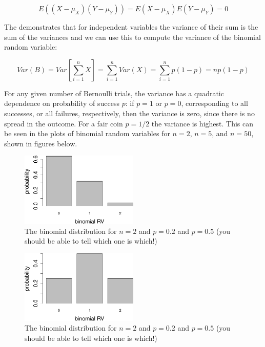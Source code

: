 \documentclass[
  letterpaper,
  DIV=11,
  numbers=noendperiod]{scrreprt}
\begin{document}
\[E((X-\mu_X)(Y-\mu_Y))  = E(X-\mu_X)E(Y-\mu_Y) = 0\]

The demonstrates that for independent variables the variance of their
sum is the sum of the variances and we can use this to compute the
variance of the binomial random variable:

\[
Var(B) = Var\left[\sum_{i=1}^n X\right]  = \sum_{i=1}^n Var(X) =\sum_{i=1}^n p(1-p) = np(1-p)
\]

For any given number of Bernoulli trials, the variance has a quadratic
dependence on probability of success \(p\): if \(p=1\) or \(p=0\),
corresponding to all successes, or all failures, respectively, then the
variance is zero, since there is no spread in the outcome. For a fair
coin \(p=1/2\) the variance is highest. This can be seen in the plots of
binomial random variables for \(n=2\), \(n=5\), and \(n=50\), shown in
figures below.

\begin{figure}

{\centering \includegraphics[width=0.5\textwidth,height=\textheight]{./probdist_files/figure-pdf/bin-dist-1-1.pdf}

}

\caption{The binomial distribution for \(n=2\) and \(p=0.2\) and
\(p=0.5\) (you should be able to tell which one is which!)}

\end{figure}

\begin{figure}

{\centering \includegraphics[width=0.5\textwidth,height=\textheight]{./probdist_files/figure-pdf/bin-dist-1-2.pdf}

}

\caption{The binomial distribution for \(n=2\) and \(p=0.2\) and
\(p=0.5\) (you should be able to tell which one is which!)}

\end{figure}
\end{document}
